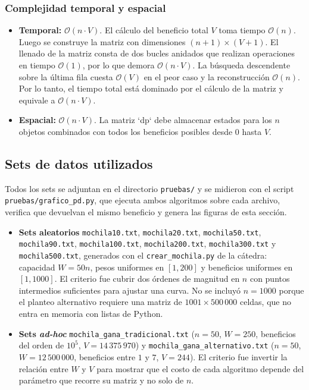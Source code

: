 \documentclass[11pt,a4paper]{article}
\begin{document}
\subsubsection{Complejidad temporal y espacial}
\begin{itemize}
    \item \textbf{Temporal:} $\mathcal{O}(n \cdot V)$. El cálculo del beneficio total $V$ toma tiempo $\mathcal{O}(n)$. Luego se construye la matriz con dimensiones $(n+1) \times (V+1)$. El llenado de la matriz consta de dos bucles anidados que realizan operaciones en tiempo $\mathcal{O}(1)$, por lo que demora $\mathcal{O}(n \cdot V)$. La búsqueda descendente sobre la última fila cuesta $\mathcal{O}(V)$ en el peor caso y la reconstrucción $\mathcal{O}(n)$. Por lo tanto, el tiempo total está dominado por el cálculo de la matriz y equivale a $\mathcal{O}(n \cdot V)$.
    \item \textbf{Espacial:} $\mathcal{O}(n \cdot V)$. La matriz `dp` debe almacenar estados para los $n$ objetos combinados con todos los beneficios posibles desde $0$ hasta $V$.
\end{itemize}

\subsection{Sets de datos utilizados}
Todos los sets se adjuntan en el directorio \texttt{pruebas/} y se midieron con el script \texttt{pruebas/grafico\_pd.py}, que ejecuta ambos algoritmos sobre cada archivo, verifica que devuelvan el mismo beneficio y genera las figuras de esta sección.
\begin{itemize}
    \item \textbf{Sets aleatorios} \texttt{mochila10.txt}, \texttt{mochila20.txt}, \texttt{mochila50.txt}, \texttt{mochila90.txt}, \texttt{mochila100.txt}, \texttt{mochila200.txt}, \texttt{mochila300.txt} y \texttt{mochila500.txt}, generados con el \texttt{crear\_mochila.py} de la cátedra: capacidad $W = 50n$, pesos uniformes en $[1, 200]$ y beneficios uniformes en $[1, 1000]$. El criterio fue cubrir dos órdenes de magnitud en $n$ con puntos intermedios suficientes para ajustar una curva. No se incluyó $n = 1000$ porque el planteo alternativo requiere una matriz de $1001 \times 500\,000$ celdas, que no entra en memoria con listas de Python.
    \item \textbf{Sets \textit{ad-hoc}} \texttt{mochila\_gana\_tradicional.txt} ($n = 50$, $W = 250$, beneficios del orden de $10^5$, $V = 14\,375\,970$) y \texttt{mochila\_gana\_alternativo.txt} ($n = 50$, $W = 12\,500\,000$, beneficios entre $1$ y $7$, $V = 244$). El criterio fue invertir la relación entre $W$ y $V$ para mostrar que el costo de cada algoritmo depende del parámetro que recorre su matriz y no solo de $n$.
\end{itemize}
\end{document}
